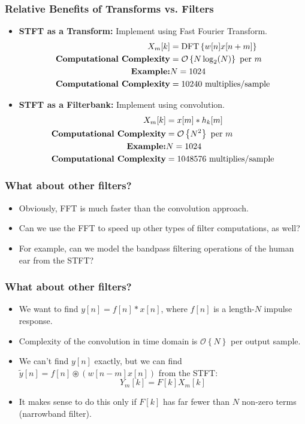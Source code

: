 \documentclass{beamer}
\begin{document}
\begin{frame}
  \frametitle{Relative Benefits of Transforms vs. Filters}
  \begin{itemize}
  \item {\bf STFT as a Transform:} Implement using Fast Fourier Transform.
    \begin{align*}
      X_m[k]&= \mbox{DFT}\left\{w[n]x[n+m]\right\}\\
      \mbox{\bf Computational Complexity} &= {\mathcal O}\left\{N\log_2(N)\right\}~\mbox{per}~m\\
      \mbox{\bf Example:} & N=1024\\
      \mbox{\bf Computational Complexity} &= 10240~\mbox{multiplies/sample}
    \end{align*}
  \item {\bf STFT as a Filterbank:} Implement using convolution.
    \begin{align*}
      X_m[k]&= x[m]\ast h_k[m]\\
      \mbox{\bf Computational Complexity} &= {\mathcal O}\left\{N^2\right\}~\mbox{per}~m\\
      \mbox{\bf Example:} & N=1024\\
      \mbox{\bf Computational Complexity} &= 1048576~\mbox{multiplies/sample}
    \end{align*}
  \end{itemize}
\end{frame}

\begin{frame}
  \frametitle{What about other filters?}

  \begin{itemize}
  \item Obviously, FFT is much faster than the convolution approach.
  \item Can we use the FFT to speed up other types of filter computations, as well?
  \item For example, can we model the bandpass filtering operations of the human ear
    from the STFT?
  \end{itemize}
\end{frame}

\begin{frame}
  \frametitle{What about other filters?}

  \begin{itemize}
    \item 
      We want to find $y[n]=f[n]\ast x[n]$, where
      $f[n]$ is a length-$N$ impulse response.
    \item Complexity of the convolution in time domain is
      ${\mathcal{O}}\left\{N\right\}$ per output sample.
    \item We can't find $y[n]$ exactly, but we can find
      $\tilde{y}[n]=f[n]\circledast (w[n-m]x[n])$ from the STFT:
      \[
      Y_m[k] = F[k]X_m[k]
      \]
    \item It makes sense to do this only if $F[k]$ has far fewer than
      $N$ non-zero terms (narrowband filter).
  \end{itemize}
\end{frame}
\end{document}
